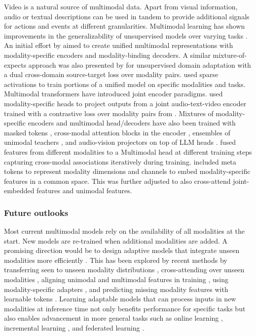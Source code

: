 Video is a natural source of multimodal data. Apart from visual information, audio or textual descriptions can be used in tandem to provide additional signals for actions and events at different granularities. Multimodal learning has shown improvements in the generalizability of unsupervised models  over varying tasks . An initial effort by  aimed to create unified multimodal representations with modality-specific encoders and modality-binding decoders. A similar mixture-of-expects approach was also presented by  for unsupervised domain adaptation with a dual cross-domain source-target loss over modality pairs.  used sparse activations to train portions of a unified model on specific modalities and tasks. Multimodal transformers have introduced joint encoder paradigms.  used modality-specific heads to project outputs from a joint audio-text-video encoder trained with a contrastive loss over modality pairs from . Mixtures of modality-specific encoders and multimodal head/decoders have also been trained with masked tokens , cross-modal attention blocks in the encoder , ensembles of unimodal teachers , and audio-vision projectors on top of LLM heads .  fused features from different modalities to a Multimodal head at different training steps capturing cross-modal associations iteratively during training.  included meta tokens to represent modality dimensions and channels to embed modality-specific features in a common space. This was further adjusted  to also cross-attend joint-embedded features and unimodal features.



\subsubsection{Future outlooks}
\label{sec:recognition::audio:::outlooks}

Most current multimodal models rely on the availability of all modalities at the start. New models are re-trained when additional modalities are added. A promising direction would be to design adaptive models that integrate unseen modalities more efficiently . This has been explored by recent methods by transferring seen to unseen modality distributions , cross-attending over unseen modalities , aligning unimodal and multimodal features in training , using modality-specific adapters , and predicting missing modality features with learnable tokens . Learning adaptable models that can process inputs in new modalities at inference time not only benefits performance for specific tasks but also enables advancement in more general tasks such as online learning , incremental learning , and federated learning .
